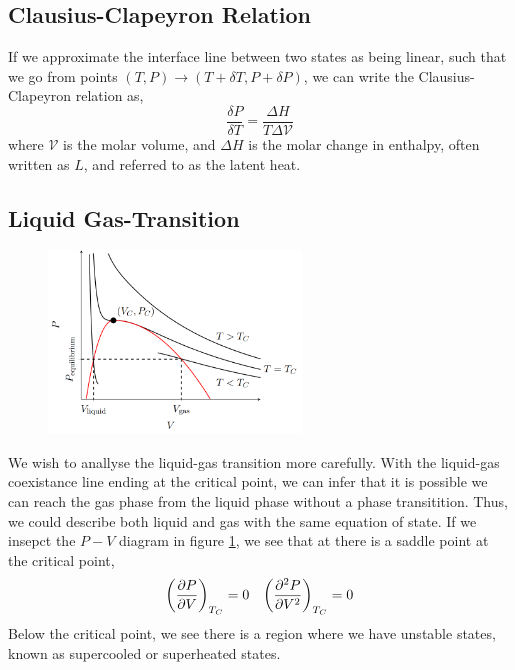 \documentclass{book}
\begin{document}
\subsection{Clausius-Clapeyron Relation}
If we approximate the interface line between two states as being linear, such that we go from points $(T,P) \to (T+\delta T, P + \delta P)$, we can write the Clausius-Clapeyron relation as,
\begin{equation}
	\frac{\delta P}{\delta T} = \frac{\Delta H}{T \Delta\mathcal{V}}
\end{equation}
where $\mathcal{V}$ is the molar volume, and $\Delta H$ is the molar change in enthalpy, often written as $L$, and referred to as the latent heat.
\subsection{Liquid Gas-Transition}
\begin{figure}
	\centering
	\includegraphics[width=0.6\textwidth]{pv phase.png}
	\caption{}
	\label{fig:pv phase}
\end{figure}
We wish to anallyse the liquid-gas transition more carefully. With the liquid-gas coexistance line ending at the critical point, we can infer that it is possible we can reach the gas phase from the liquid phase without a phase transitition. Thus, we could describe both liquid and gas with the same equation of state. If we insepct the $P-V$ diagram in figure \ref{fig:pv phase}, we see that at there is a saddle point at the critical point,
\begin{align}
	\left(\pdv{P}{V}\right)_{T_C} = 0 && \left(\pdv[2]{P}{V}\right)_{T_C} = 0 \label{eq:fkjhdsklaj}
\end{align}
Below the critical point, we see there is a region where we have unstable states, known as supercooled or superheated states.
\end{document}
